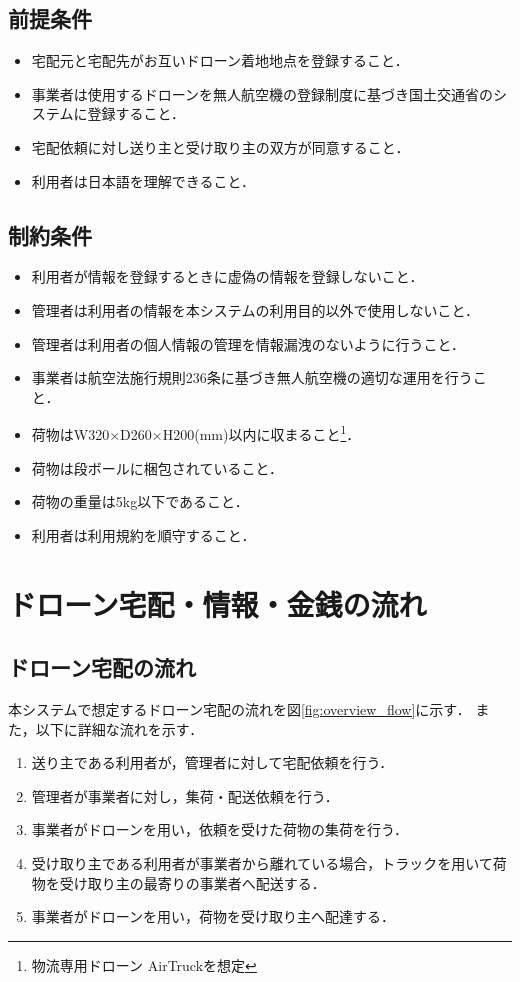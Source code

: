 \documentclass[a4paper, titlepage]{jsarticle}
\begin{document}
\subsection{前提条件}
\begin{itemize}
  \item 宅配元と宅配先がお互いドローン着地地点を登録すること．
  \item 事業者は使用するドローンを無人航空機の登録制度に基づき国土交通省のシステムに登録すること．
  \item 宅配依頼に対し送り主と受け取り主の双方が同意すること．
  \item 利用者は日本語を理解できること．
\end{itemize}
\subsection{制約条件}
\begin{itemize}
  \item 利用者が情報を登録するときに虚偽の情報を登録しないこと．
  \item 管理者は利用者の情報を本システムの利用目的以外で使用しないこと．
  \item 管理者は利用者の個人情報の管理を情報漏洩のないように行うこと．
  \item 事業者は航空法施行規則236条に基づき無人航空機の適切な運用を行うこと．
  \item 荷物はW320$\times$D260$\times$H200(mm)以内に収まること\footnote{\label{fot:airtruck}物流専用ドローン AirTruck\cite{aeronext_airtruck}を想定}．
  \item 荷物は段ボールに梱包されていること．
  \item 荷物の重量は5kg以下であること．
  \item 利用者は利用規約を順守すること．
\end{itemize}
\section{ドローン宅配・情報・金銭の流れ}

\subsection{ドローン宅配の流れ}
本システムで想定するドローン宅配の流れを図\ref{fig:overview_flow}に示す．
また，以下に詳細な流れを示す．

\begin{enumerate}[label=\raise0.2ex\hbox{\textcircled{\scriptsize{\arabic*}}}]
  \item 送り主である利用者が，管理者に対して宅配依頼を行う．
  \item 管理者が事業者に対し，集荷・配送依頼を行う．
  \item 事業者がドローンを用い，依頼を受けた荷物の集荷を行う．
  \item 受け取り主である利用者が事業者から離れている場合，トラックを用いて荷物を受け取り主の最寄りの事業者へ配送する．
  \item 事業者がドローンを用い，荷物を受け取り主へ配達する．
\end{enumerate}
\end{document}
